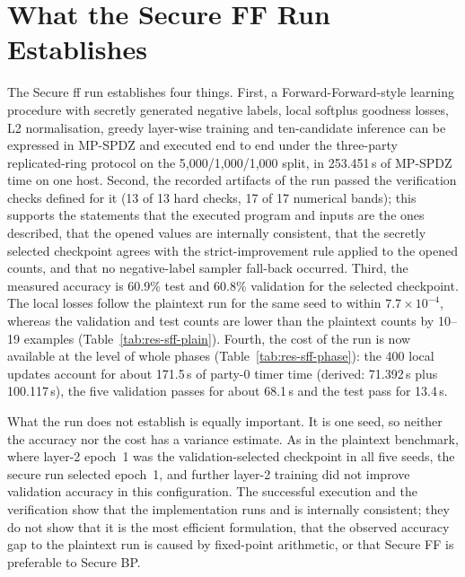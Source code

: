 \section{What the Secure FF Run Establishes}\label{sec:disc-sff}
The Secure \ac{ff} run establishes four things. First, a Forward-Forward-style learning procedure with secretly generated negative labels, local softplus goodness losses, L2 normalisation, greedy layer-wise training and ten-candidate inference can be expressed in MP-SPDZ and executed end to end under the three-party replicated-ring protocol on the 5{,}000/1{,}000/1{,}000 split, in 253.451\,s of MP-SPDZ time on one host. Second, the recorded artifacts of the run passed the verification checks defined for it (13 of 13 hard checks, 17 of 17 numerical bands); this supports the statements that the executed program and inputs are the ones described, that the opened values are internally consistent, that the secretly selected checkpoint agrees with the strict-improvement rule applied to the opened counts, and that no negative-label sampler fall-back occurred. Third, the measured accuracy is 60.9\% test and 60.8\% validation for the selected checkpoint. The local losses follow the plaintext run for the same seed to within $7.7\times10^{-4}$, whereas the validation and test counts are lower than the plaintext counts by 10--19 examples (Table~\ref{tab:res-sff-plain}). Fourth, the cost of the run is now available at the level of whole phases (Table~\ref{tab:res-sff-phase}): the 400 local updates account for about 171.5\,s of party-0 timer time (derived: 71.392\,s plus 100.117\,s), the five validation passes for about 68.1\,s and the test pass for 13.4\,s.

What the run does not establish is equally important. It is one seed, so neither the accuracy nor the cost has a variance estimate. As in the plaintext benchmark, where layer-2 epoch~1 was the validation-selected checkpoint in all five seeds, the secure run selected epoch~1, and further layer-2 training did not improve validation accuracy in this configuration. The successful execution and the verification show that the implementation runs and is internally consistent; they do not show that it is the most efficient formulation, that the observed accuracy gap to the plaintext run is caused by fixed-point arithmetic, or that Secure FF is preferable to Secure BP.

